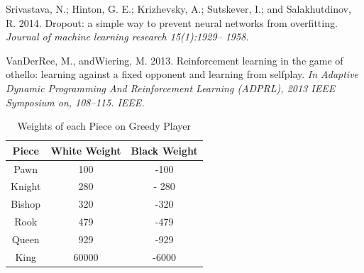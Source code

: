 \documentclass[11pt]{article}
\begin{document}
\begin{thebibliography}{}

\newblock [Srivastava et al. 2014] Srivastava, N.; Hinton, G. E.; Krizhevsky, A.; Sutskever, I.; and Salakhutdinov, R. 2014. 
\newblock Dropout: a simple way to prevent neural networks from overﬁtting. {\em Journal of machine learning research 15(1):1929– 1958.} 


 VanDerRee, M., andWiering, M. 2013.
\newblock  Reinforcement learning in the game of othello: learning against a ﬁxed opponent and learning from selfplay. {\em In Adaptive Dynamic Programming And Reinforcement Learning (ADPRL), 2013 IEEE Symposium on, 108–115. IEEE.}


\end{thebibliography}

\begin{table}[h]
\begin{center}
\begin{tabular}{c c c}
\hline \bf Piece & \bf White Weight & \bf Black Weight \\ \hline
Pawn & 100 & -100 \\
Knight & 280 & - 280 \\
Bishop & 320 & -320 \\
Rook & 479 & -479 \\
Queen & 929 & -929 \\
King & 60000 & -6000 \\
\hline
\end{tabular}
\end{center}
\caption{\label{font-table} Weights of each Piece on Greedy Player }
\end{table}
\end{document}
